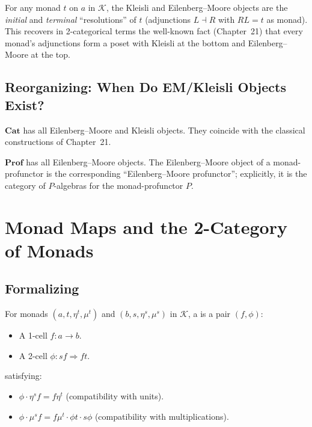 \begin{remark}
For any monad $t$ on $a$ in $\mathcal{K}$, the Kleisli and Eilenberg--Moore
objects are the \emph{initial} and \emph{terminal} ``resolutions'' of $t$
(adjunctions $L \dashv R$ with $RL = t$ as monad). This recovers in
2-categorical terms the well-known fact (Chapter~21) that every monad's
adjunctions form a poset with Kleisli at the bottom and Eilenberg--Moore at
the top.
\end{remark}

\subsection{Reorganizing: When Do EM/Kleisli Objects Exist?}

\begin{theorem}
\label{thm:em-exists-cat}
$\mathbf{Cat}$ has all Eilenberg--Moore and Kleisli objects. They coincide
with the classical constructions of Chapter~21.
\end{theorem}

\begin{theorem}
\label{thm:em-exists-prof}
$\mathbf{Prof}$ has all Eilenberg--Moore objects. The Eilenberg--Moore
object of a monad-profunctor is the corresponding ``Eilenberg--Moore
profunctor''; explicitly, it is the category of $P$-algebras for the
monad-profunctor $P$.
\end{theorem}


\section{Monad Maps and the 2-Category of Monads}
\label{sec:monad-maps}

\subsection{Formalizing}

\begin{definition}
\label{def:monad-map}
For monads $(a, t, \eta^t, \mu^t)$ and $(b, s, \eta^s, \mu^s)$ in $\mathcal{K}$,
a  is a pair $(f, \phi)$:
\begin{itemize}
  \item A 1-cell $f : a \to b$.
  \item A 2-cell $\phi : s f \Rightarrow f t$.
\end{itemize}
satisfying:
\begin{itemize}
  \item $\phi \cdot \eta^s f = f \eta^t$ (compatibility with units).
  \item $\phi \cdot \mu^s f = f \mu^t \cdot \phi t \cdot s \phi$
        (compatibility with multiplications).
\end{itemize}
\end{definition}

